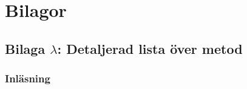 \documentclass[12pt,a4paper]{article}
\begin{document}
\newpage
{}




\newpage
\section*{Bilagor}
\label{sec:bilaga}

\subsection*{Bilaga $\lambda$: Detaljerad lista över metod}

\subsubsection*{Inläsning}
\end{document}

